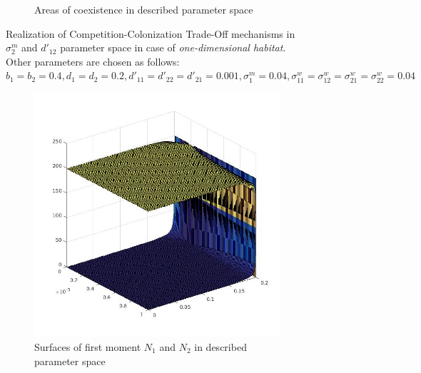 \documentclass[%
 aip,
rsi,%
 amsmath,amssymb,
 reprint,%
]{revtex4-1}
\begin{document}
\begin{figure}
\begin{subfigure}{.5\textwidth}
  \caption{Areas of coexistence in described parameter space} 
  \label{fig:cctod1:sub2}
\end{subfigure}
\caption{Realization of Competition-Colonization Trade-Off mechanisms in $\sigma^m_2$ and $d'_{12}$ parameter space in case of \emph{one-dimensional habitat}. Other parameters are chosen as follows:  $b_{1}=b_{2}=0.4
		, d_{1}=d_{2}=0.2
		, d'_{11}=d'_{22}=d'_{21}=0.001,
		\sigma_{1}^{m}=0.04
            , \sigma_{11}^{w}=\sigma_{12}^{w}=\sigma_{21}^{w}=\sigma_{22}^{w}=0.04$}
\label{fig:cctod1}
\end{figure}

\begin{figure}
\centering
\begin{subfigure}{.5\textwidth}
  \centering
  \includegraphics[width=.95\linewidth]{N1N2cctoD2.jpg}
  \caption{Surfaces of first moment \(N_1\) and \(N_2\) in described parameter space}
  \label{fig:cctod2:sub1}
\end{subfigure}%
\begin{subfigure}{.5\textwidth}
  \centering

\end{subfigure}
\end{figure}
\end{document}
